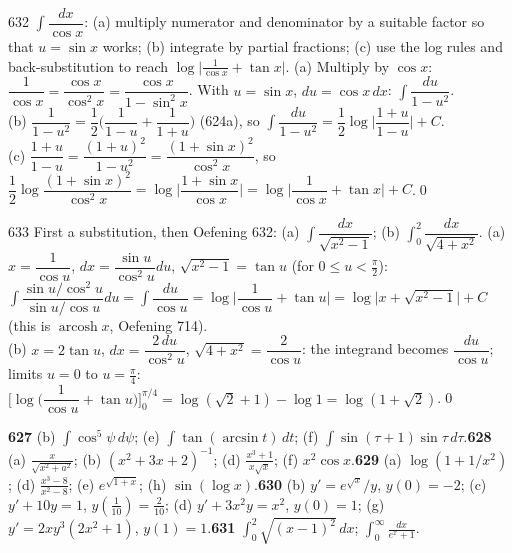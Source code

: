 \begin{bookex}{632}
$\int\dfrac{dx}{\cos x}$: (a) multiply numerator and denominator by a suitable factor so that $u=\sin x$ works; (b) integrate by partial fractions; (c) use the log rules and back-substitution to reach $\log\big|\frac1{\cos x}+\tan x\big|$.
\solution
(a) Multiply by $\cos x$: $\dfrac1{\cos x}=\dfrac{\cos x}{\cos^2x}=\dfrac{\cos x}{1-\sin^2x}$. With $u=\sin x$, $du=\cos x\,dx$: $\int\dfrac{du}{1-u^2}$.\\
(b) $\dfrac1{1-u^2}=\dfrac12\Big(\dfrac1{1-u}+\dfrac1{1+u}\Big)$ (624a), so $\int\dfrac{du}{1-u^2}=\dfrac12\log\Big|\dfrac{1+u}{1-u}\Big|+C$.\\
(c) $\dfrac{1+u}{1-u}=\dfrac{(1+u)^2}{1-u^2}=\dfrac{(1+\sin x)^2}{\cos^2x}$, so $\dfrac12\log\dfrac{(1+\sin x)^2}{\cos^2x}=\log\Big|\dfrac{1+\sin x}{\cos x}\Big|=\log\Big|\dfrac1{\cos x}+\tan x\Big|+C$.\qed
\end{bookex}

\begin{bookex}{633}
First a substitution, then Oefening 632: (a) $\int\dfrac{dx}{\sqrt{x^2-1}}$; (b) $\int_0^2\dfrac{dx}{\sqrt{4+x^2}}$.
\solution
(a) $x=\dfrac1{\cos u}$, $dx=\dfrac{\sin u}{\cos^2u}du$, $\sqrt{x^2-1}=\tan u$ (for $0\le u<\frac\pi2$): $\int\dfrac{\sin u/\cos^2u}{\sin u/\cos u}du=\int\dfrac{du}{\cos u}=\log\Big|\dfrac1{\cos u}+\tan u\Big|=\log\big|x+\sqrt{x^2-1}\big|+C$ (this is $\operatorname{arcosh}x$, Oefening 714).\\
(b) $x=2\tan u$, $dx=\dfrac{2\,du}{\cos^2u}$, $\sqrt{4+x^2}=\dfrac2{\cos u}$: the integrand becomes $\dfrac{du}{\cos u}$; limits $u=0$ to $u=\frac\pi4$: $\Big[\log\Big(\dfrac1{\cos u}+\tan u\Big)\Big]_0^{\pi/4}=\log(\sqrt2+1)-\log1=\log(1+\sqrt2)$.\qed
\end{bookex}

\begin{trybox}[{627(b),(e),(f), 628(a),(b),(d),(f), 629(a),(d),(e),(h), 630(b),(c),(d),(g), 631}]
\textbf{627} (b) $\int\cos^5\psi\,d\psi$; (e) $\int\tan(\arcsin t)\,dt$; (f) $\int\sin(\tau+1)\sin\tau\,d\tau$.\quad \textbf{628} (a) $\frac x{\sqrt{x^2+a^2}}$; (b) $(x^2+3x+2)^{-1}$; (d) $\frac{x^3+1}{x\sqrt x}$; (f) $x^2\cos x$.\quad \textbf{629} (a) $\log(1+1/x^2)$; (d) $\frac{x^3-8}{x^2-8}$; (e) $e^{\sqrt{1+x}}$; (h) $\sin(\log x)$.\quad \textbf{630} (b) $y'=e^{\sqrt x}/y$, $y(0)=-2$; (c) $y'+10y=1$, $y(\frac1{10})=\frac2{10}$; (d) $y'+3x^2y=x^2$, $y(0)=1$; (g) $y'=2xy^3(2x^2+1)$, $y(1)=1$.\quad \textbf{631} $\int_0^2\sqrt{(x-1)^2}\,dx$; $\int_0^\infty\frac{dx}{e^x+1}$.
\end{trybox}

